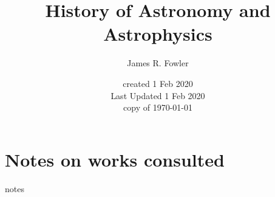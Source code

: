 \documentclass[letterpaper]{article}
\begin{document}
\title{History of Astronomy and Astrophysics}
\author{James R. Fowler}
\date{created 1 Feb 2020\\ Last Updated 1 Feb 2020\\ copy of \today}

\tableofcontents

\section{Notes on works consulted}

{notes}

\printbibliography
\end{document}
